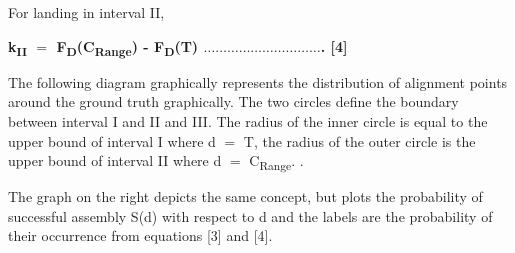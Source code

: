 \documentclass[11pt]{book}
\begin{document}
For landing in interval II, 

\textbf{k\textsubscript{II} $=$ F\textsubscript{D}(C\textsubscript{Range}) - F\textsubscript{D}(T) $\ldots$$\ldots$$\ldots$$\ldots$$\ldots$$\ldots$$\ldots$$\ldots$$\ldots$$\ldots$. [4]}

The following diagram graphically represents the distribution of alignment points around the ground truth graphically. The two circles define the boundary between interval I and II and III. The radius of the inner circle is equal to the upper bound of interval I where d $=$ T, the radius of the outer circle is the upper bound of interval II where d $=$ C\textsubscript{Range}. . 

The graph on the right depicts the same concept, but plots the probability of successful assembly S(d) with respect to d and the labels are the probability of their occurrence from equations [3] and [4].
\end{document}

